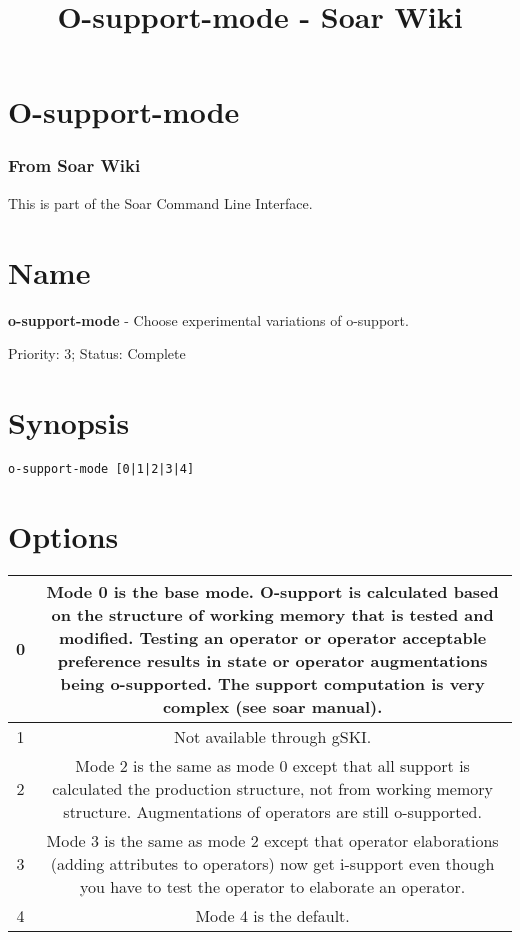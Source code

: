 \documentclass[10pt]{article}
\title{O-support-mode - Soar Wiki}
\begin{document}
\section*{O-support-mode}
\subsubsection*{From Soar Wiki}


 This is part of the Soar Command Line Interface. 
\section*{ Name }


 \textbf{o-support-mode}
 - Choose experimental variations of o-support. 


 Priority: 3; Status: Complete
\section*{ Synopsis }
\begin{verbatim}
o-support-mode [0|1|2|3|4]

\end{verbatim}
\section*{ Options }


\begin{tabular}{|c|c|}
\hline 
 0  & Mode 0 is the base mode. O-support is calculated based on the structure of working memory that is tested and modified. Testing an operator or operator acceptable preference results in state or operator augmentations being o-supported. The support computation is very complex (see soar manual).  \\
 \hline 
 1  & Not available through gSKI.  \\
 \hline 
 2  & Mode 2 is the same as mode 0 except that all support is calculated the production structure, not from working memory structure. Augmentations of operators are still o-supported.  \\
 \hline 
 3  & Mode 3 is the same as mode 2 except that operator elaborations (adding attributes to operators) now get i-support even though you have to test the operator to elaborate an operator.  \\
 \hline 
 4  & Mode 4 is the default.  \\
 \hline 

\end{tabular}
\end{document}
